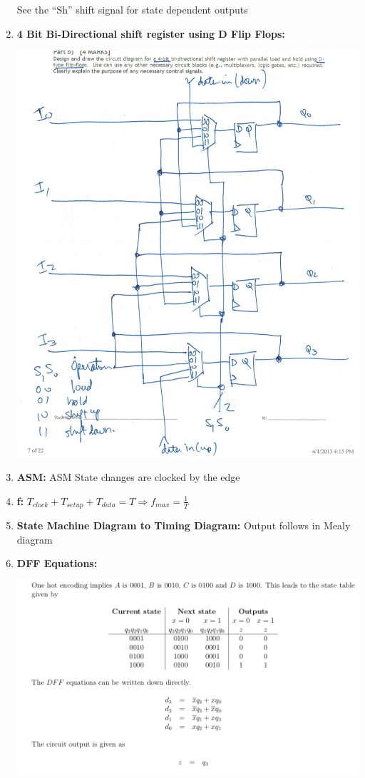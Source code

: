 \documentclass[10pt]{article}
\begin{document}
\begin{enumerate}
{    }
    \medskip
    See the ``Sh'' shift signal for state dependent outputs\newpage
\item \textbf{4 Bit Bi-Directional shift register using D Flip Flops: }\\
\parbox{\linewidth}{
        \includegraphics[scale=1]{4BIT.png}
    }
\item \textbf{ASM:} ASM State changes are clocked by the edge
\item \textbf{f:} $T_{clock} + T_{setup} + T_{data} = T \Rightarrow f_{max} = \frac{1}{T}$
\item \textbf{State Machine Diagram to Timing Diagram:} Output follows in Mealy diagram\newpage
\item \textbf{DFF Equations:}\\
\parbox{\linewidth}{
        \includegraphics[scale=1]{DFF.png}
}
\end{enumerate}
\end{document}
